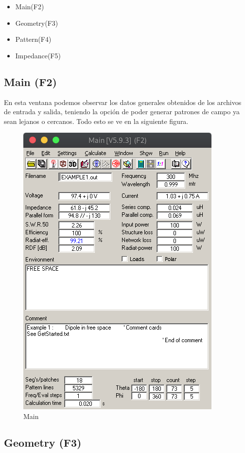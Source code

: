 \documentclass[11pt,a4paper]{article}
\begin{document}
\begin{itemize}
    \item Main(F2)
    \item Geometry(F3)
    \item Pattern(F4)
    \item Impedance(F5)
\end{itemize}

\subsection{Main (F2)}\label{sec:2.1}

En esta ventana podemos observar los datos generales obtenidos de los archivos de entrada y salida, teniendo la opci\'on de poder generar patrones de campo ya sean lejanos o cercanos. Todo esto se ve en la siguiente figura.

\begin{figure}[H]
    \centering
    \includegraphics[scale=0.35]{images/Interfaz/main.png}
    \caption{Main}
    \label{fig1:Main}
\end{figure}

\subsection{Geometry (F3)}\label{sec:2.2}
\end{document}
